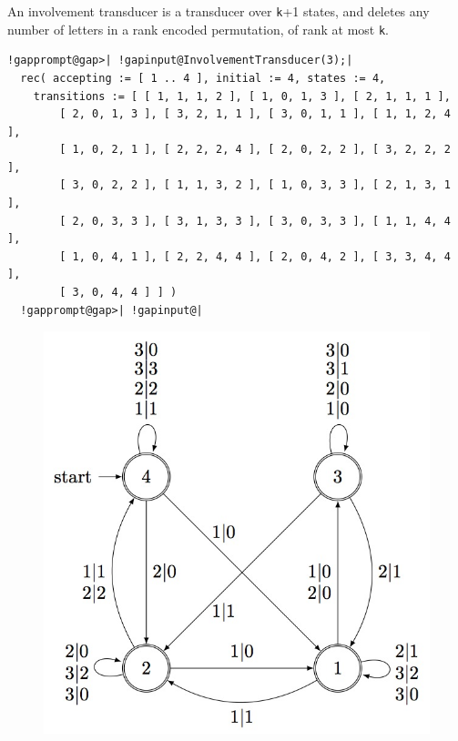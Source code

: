 \documentclass[a4paper,11pt]{report}
\begin{document}
{{{ An involvement transducer is a transducer over \texttt{k}+1 states, and deletes any number of letters in a rank encoded permutation, of
rank at most \texttt{k}. 
\begin{Verbatim}[commandchars=!@|,fontsize=\small,frame=single,label=Example]
  !gapprompt@gap>| !gapinput@InvolvementTransducer(3);|
  rec( accepting := [ 1 .. 4 ], initial := 4, states := 4, 
    transitions := [ [ 1, 1, 1, 2 ], [ 1, 0, 1, 3 ], [ 2, 1, 1, 1 ], 
        [ 2, 0, 1, 3 ], [ 3, 2, 1, 1 ], [ 3, 0, 1, 1 ], [ 1, 1, 2, 4 ], 
        [ 1, 0, 2, 1 ], [ 2, 2, 2, 4 ], [ 2, 0, 2, 2 ], [ 3, 2, 2, 2 ], 
        [ 3, 0, 2, 2 ], [ 1, 1, 3, 2 ], [ 1, 0, 3, 3 ], [ 2, 1, 3, 1 ], 
        [ 2, 0, 3, 3 ], [ 3, 1, 3, 3 ], [ 3, 0, 3, 3 ], [ 1, 1, 4, 4 ], 
        [ 1, 0, 4, 1 ], [ 2, 2, 4, 4 ], [ 2, 0, 4, 2 ], [ 3, 3, 4, 4 ], 
        [ 3, 0, 4, 4 ] ] )
  !gapprompt@gap>| !gapinput@|
\end{Verbatim}
 
      \begin{figure}[H] \begin{center} \leavevmode \includegraphics[scale=0.75]{img/it3.jpg} \end{center} \end{figure}
      }

 

}}
\end{document}
